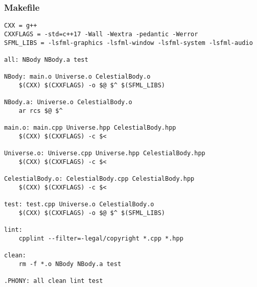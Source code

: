 \documentclass[12pt]{article}
\begin{document}
\subsubsection{Makefile}
\begin{lstlisting}[style=cppcode]
CXX = g++
CXXFLAGS = -std=c++17 -Wall -Wextra -pedantic -Werror
SFML_LIBS = -lsfml-graphics -lsfml-window -lsfml-system -lsfml-audio

all: NBody NBody.a test

NBody: main.o Universe.o CelestialBody.o
	$(CXX) $(CXXFLAGS) -o $@ $^ $(SFML_LIBS)

NBody.a: Universe.o CelestialBody.o
	ar rcs $@ $^

main.o: main.cpp Universe.hpp CelestialBody.hpp
	$(CXX) $(CXXFLAGS) -c $<

Universe.o: Universe.cpp Universe.hpp CelestialBody.hpp
	$(CXX) $(CXXFLAGS) -c $<

CelestialBody.o: CelestialBody.cpp CelestialBody.hpp
	$(CXX) $(CXXFLAGS) -c $<

test: test.cpp Universe.o CelestialBody.o
	$(CXX) $(CXXFLAGS) -o $@ $^ $(SFML_LIBS)

lint:
	cpplint --filter=-legal/copyright *.cpp *.hpp

clean:
	rm -f *.o NBody NBody.a test

.PHONY: all clean lint test
\end{lstlisting}
\end{document}
